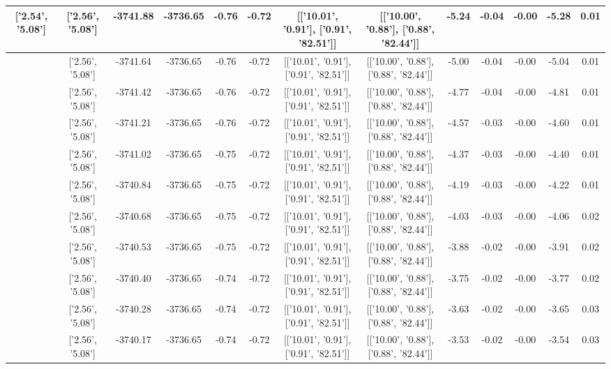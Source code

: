 \begin{table}[htbp]
\begin{adjustbox}{angle=90}
\begin{tabular}{|c|c|c|c|c|c|c|c|c|c|c|c|c|}
 ['2.54', '5.08'] & ['2.56', '5.08'] & -3741.88 & -3736.65 & -0.76 & -0.72 & [['10.01', '0.91'], ['0.91', '82.51']] & [['10.00', '0.88'], ['0.88', '82.44']] & -5.24 & -0.04 & -0.00 & -5.28 & 0.01\\ \hline
 ['2.54', '5.08'] & ['2.56', '5.08'] & -3741.64 & -3736.65 & -0.76 & -0.72 & [['10.01', '0.91'], ['0.91', '82.51']] & [['10.00', '0.88'], ['0.88', '82.44']] & -5.00 & -0.04 & -0.00 & -5.04 & 0.01\\ \hline
 ['2.55', '5.08'] & ['2.56', '5.08'] & -3741.42 & -3736.65 & -0.76 & -0.72 & [['10.01', '0.91'], ['0.91', '82.51']] & [['10.00', '0.88'], ['0.88', '82.44']] & -4.77 & -0.04 & -0.00 & -4.81 & 0.01\\ \hline
 ['2.55', '5.08'] & ['2.56', '5.08'] & -3741.21 & -3736.65 & -0.76 & -0.72 & [['10.01', '0.91'], ['0.91', '82.51']] & [['10.00', '0.88'], ['0.88', '82.44']] & -4.57 & -0.03 & -0.00 & -4.60 & 0.01\\ \hline
 ['2.55', '5.08'] & ['2.56', '5.08'] & -3741.02 & -3736.65 & -0.75 & -0.72 & [['10.01', '0.91'], ['0.91', '82.51']] & [['10.00', '0.88'], ['0.88', '82.44']] & -4.37 & -0.03 & -0.00 & -4.40 & 0.01\\ \hline
 ['2.55', '5.08'] & ['2.56', '5.08'] & -3740.84 & -3736.65 & -0.75 & -0.72 & [['10.01', '0.91'], ['0.91', '82.51']] & [['10.00', '0.88'], ['0.88', '82.44']] & -4.19 & -0.03 & -0.00 & -4.22 & 0.01\\ \hline
 ['2.55', '5.08'] & ['2.56', '5.08'] & -3740.68 & -3736.65 & -0.75 & -0.72 & [['10.01', '0.91'], ['0.91', '82.51']] & [['10.00', '0.88'], ['0.88', '82.44']] & -4.03 & -0.03 & -0.00 & -4.06 & 0.02\\ \hline
 ['2.55', '5.08'] & ['2.56', '5.08'] & -3740.53 & -3736.65 & -0.75 & -0.72 & [['10.01', '0.91'], ['0.91', '82.51']] & [['10.00', '0.88'], ['0.88', '82.44']] & -3.88 & -0.02 & -0.00 & -3.91 & 0.02\\ \hline
 ['2.55', '5.08'] & ['2.56', '5.08'] & -3740.40 & -3736.65 & -0.74 & -0.72 & [['10.01', '0.91'], ['0.91', '82.51']] & [['10.00', '0.88'], ['0.88', '82.44']] & -3.75 & -0.02 & -0.00 & -3.77 & 0.02\\ \hline
 ['2.55', '5.08'] & ['2.56', '5.08'] & -3740.28 & -3736.65 & -0.74 & -0.72 & [['10.01', '0.91'], ['0.91', '82.51']] & [['10.00', '0.88'], ['0.88', '82.44']] & -3.63 & -0.02 & -0.00 & -3.65 & 0.03\\ \hline
 ['2.56', '5.08'] & ['2.56', '5.08'] & -3740.17 & -3736.65 & -0.74 & -0.72 & [['10.01', '0.91'], ['0.91', '82.51']] & [['10.00', '0.88'], ['0.88', '82.44']] & -3.53 & -0.02 & -0.00 & -3.54 & 0.03\\ \hline

\end{tabular}
\end{adjustbox}
\end{table}
